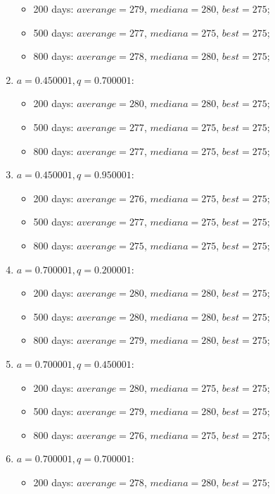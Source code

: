 \begin{enumerate}
	\begin{itemize}
		\item 200 days: $averange = 279$, $mediana = 280$, $best = 275$;
		\item 500 days: $averange = 277$, $mediana = 275$, $best = 275$;
		\item 800 days: $averange = 278$, $mediana = 280$, $best = 275$;
	\end{itemize}
\item $a= 0.450001, q= 0.700001$:
	\begin{itemize}
		\item 200 days: $averange = 280$, $mediana = 280$, $best = 275$;
		\item 500 days: $averange = 277$, $mediana = 275$, $best = 275$;
		\item 800 days: $averange = 277$, $mediana = 275$, $best = 275$;
	\end{itemize}
\item $a= 0.450001, q= 0.950001$:
	\begin{itemize}
		\item 200 days: $averange = 276$, $mediana = 275$, $best = 275$;
		\item 500 days: $averange = 277$, $mediana = 275$, $best = 275$;
		\item 800 days: $averange = 275$, $mediana = 275$, $best = 275$;
	\end{itemize}
\item $a= 0.700001, q= 0.200001$:
	\begin{itemize}
		\item 200 days: $averange = 280$, $mediana = 280$, $best = 275$;
		\item 500 days: $averange = 280$, $mediana = 280$, $best = 275$;
		\item 800 days: $averange = 279$, $mediana = 280$, $best = 275$;
	\end{itemize}
\item $a= 0.700001, q= 0.450001$:
	\begin{itemize}
		\item 200 days: $averange = 280$, $mediana = 275$, $best = 275$;
		\item 500 days: $averange = 279$, $mediana = 280$, $best = 275$;
		\item 800 days: $averange = 276$, $mediana = 275$, $best = 275$;
	\end{itemize}
\item $a= 0.700001, q= 0.700001$:
	\begin{itemize}
		\item 200 days: $averange = 278$, $mediana = 280$, $best = 275$;

\end{itemize}
\end{enumerate}
